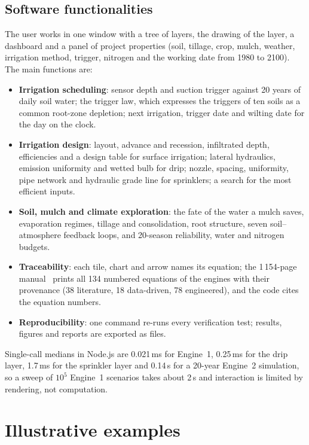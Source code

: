 \documentclass[preprint,12pt]{elsarticle}
\begin{document}
\subsection{Software functionalities}
The user works in one window with a tree of layers, the drawing of the layer, a dashboard and a panel of project properties (soil, tillage, crop, mulch, weather, irrigation method, trigger, nitrogen and the working date from 1980 to 2100). The main functions are:
\begin{itemize}[nosep]
\item \textbf{Irrigation scheduling}: sensor depth and suction trigger against 20 years of daily soil water; the trigger law, which expresses the triggers of ten soils as a common root-zone depletion; next irrigation, trigger date and wilting date for the day on the clock.
\item \textbf{Irrigation design}: layout, advance and recession, infiltrated depth, efficiencies and a design table for surface irrigation; lateral hydraulics, emission uniformity and wetted bulb for drip; nozzle, spacing, uniformity, pipe network and hydraulic grade line for sprinklers; a search for the most efficient inputs.
\item \textbf{Soil, mulch and climate exploration}: the fate of the water a mulch saves, evaporation regimes, tillage and consolidation, root structure, seven soil--atmosphere feedback loops, and 20-season reliability, water and nitrogen budgets.
\item \textbf{Traceability}: each tile, chart and arrow names its equation; the 1\,154-page manual~\cite{HaliluManual} prints all 134 numbered equations of the engines with their provenance (38 literature, 18 data-driven, 78 engineered), and the code cites the equation numbers.
\item \textbf{Reproducibility}: one command re-runs every verification test; results, figures and reports are exported as files.
\end{itemize}
Single-call medians in Node.js are 0.021\,ms for Engine~1, 0.25\,ms for the drip layer, 1.7\,ms for the sprinkler layer and 0.14\,s for a 20-year Engine~2 simulation, so a sweep of $10^5$ Engine~1 scenarios takes about 2\,s and interaction is limited by rendering, not computation.

\section{Illustrative examples}
\end{document}
